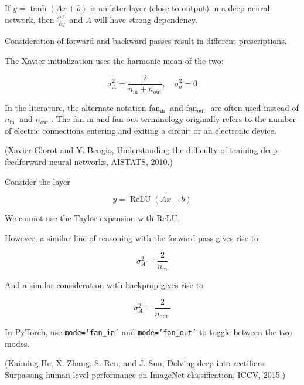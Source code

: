 \begin{definition}
    If $y=\tanh (A x+b)$ is an later layer (close to output) in a deep neural network, then $\frac{\partial \ell}{\partial y}$ and $A$ will have strong dependency.

    \par\noindent\textcolor{gray}{\hdashrule{\textwidth}{0.4pt}{1pt 2pt}}

    Consideration of forward and backward passes result in different prescriptions.

    The Xavier initialization uses the harmonic mean of the two:

    $$
    \sigma_{A}^{2}=\frac{2}{n_{\mathrm{in}}+n_{\mathrm{out}}}, \quad \sigma_{b}^{2}=0
    $$

    In the literature, the alternate notation $\text{fan}_{\text {in }}$ and $\text{fan}_{\text {out }}$ are often used instead of $n_{\text {in }}$ and $n_{\text {out }}$. The fan-in and fan-out terminology originally refers to the number of electric connections entering and exiting a circuit or an electronic device.

    (Xavier Glorot and Y. Bengio, Understanding the difficulty of training deep feedforward neural networks, AISTATS, 2010.)
\end{definition}

\begin{definition}
    Consider the layer

    $$
    y=\operatorname{ReLU}(A x+b)
    $$

    We cannot use the Taylor expansion with ReLU.

    However, a similar line of reasoning with the forward pass gives rise to

    $$
    \sigma_{A}^{2}=\frac{2}{n_{\mathrm{in}}}
    $$

    And a similar consideration with backprop gives rise to

    $$
    \sigma_{A}^{2}=\frac{2}{n_{\text {out }}}
    $$

    In PyTorch, use \texttt{mode='fan_in'} and \texttt{mode='fan_out'} to toggle between the two modes.

    (Kaiming He, X. Zhang, S. Ren, and J. Sun, Delving deep into rectifiers: Surpassing human-level performance on ImageNet classification, ICCV, 2015.)
\end{definition}

